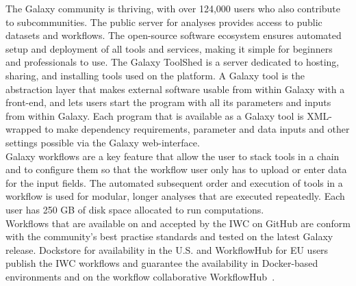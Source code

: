 The Galaxy community is thriving, with over 124,000 users who also contribute to subcommunities. The public server for analyses provides access to public datasets and workflows. The open-source software ecosystem ensures automated setup and deployment of all tools and services, making it simple for beginners and professionals to use. The Galaxy ToolShed is a server dedicated to hosting, sharing, and installing tools used on the platform. A Galaxy tool is the abstraction layer that makes external software usable from within Galaxy with a front-end, and lets users start the program with all its parameters and inputs from within Galaxy. Each program that is available as a Galaxy tool is XML-wrapped to make dependency requirements, parameter and data inputs and other settings possible via the Galaxy web-interface. \\ 
Galaxy workflows are a key feature that allow the user to stack tools in a chain and to configure them so that the workflow user only has to upload or enter data for the input fields. The automated subsequent order and execution of tools in a workflow is used for modular, longer analyses that are executed repeatedly. Each user has 250 GB of disk space allocated to run computations. \\
Workflows that are available on and accepted by the \ac{IWC} on GitHub are conform with the community's best practise standards and tested on the latest Galaxy release. Dockstore for availability in the U.S. and WorkflowHub for EU users publish the \ac{IWC} workflows and guarantee the availability in Docker-based environments and on the workflow collaborative WorkflowHub~\cite{o2017dockstore, goble2021implementing}.

